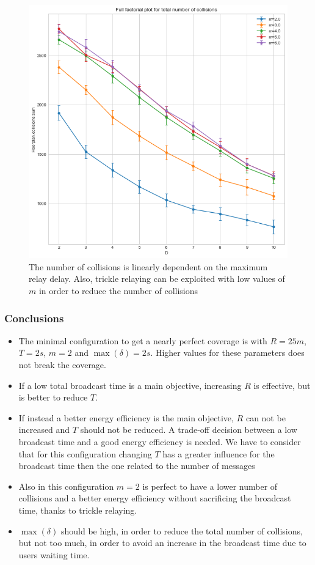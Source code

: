 \begin{figure}
	\centering
	\includegraphics[width=\textwidth]{img/ld/collisions-D-ffplot}
	\caption{The number of collisions is linearly dependent on the maximum
	relay delay. Also, trickle relaying can be exploited with low values of
	\(m\) in order to reduce the number of
	collisions}\label{fig:ldcollisionsff}
\end{figure}

\subsubsection{Conclusions}\label{subsubsec:ldconclusions}

\begin{itemize}
	\item The minimal configuration to get a nearly perfect coverage is with
		\(R\!=\!25m\), \(T\!=\!2s\), \(m\!=\!2\) and
		\(\max(\delta)\!=\!2s\). Higher values for these parameters does
		not break the coverage.
	\item If a low total broadcast time is a main objective, increasing
		\(R\) is effective, but is better to reduce \(T\).
	\item If instead a better energy efficiency is the main objective, \(R\)
		can not be increased and \(T\) should not be reduced. A
		trade-off decision between a low broadcast time and a good
		energy efficiency is needed. We have to consider that for this
		configuration changing \(T\) has a greater influence for the
		broadcast time then the one related to the number of messages
	\item Also in this configuration \(m\!=\!2\) is perfect to have a lower
		number of collisions and a better energy efficiency without
		sacrificing the broadcast time, thanks to trickle relaying.
	\item \(\max(\delta)\) should be high, in order to reduce the total
		number of collisions, but not too much, in order to avoid an
		increase in the broadcast time due to users waiting time.
\end{itemize}
